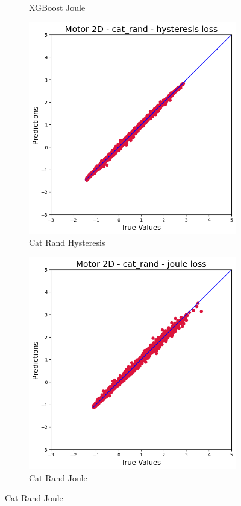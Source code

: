 \documentclass{article}
\begin{document}
\begin{figure}[!htbp]
\begin{subfigure}[b]{0.23\textwidth}
        \caption{XGBoost Joule}
    \end{subfigure}
    \hfill
    \begin{subfigure}[b]{0.23\textwidth}
        \centering
        \includegraphics[width=\textwidth]{images/2D/cat_rand_hysteresis.png}
        \caption{Cat Rand Hysteresis}
    \end{subfigure}
    \hfill
    \begin{subfigure}[b]{0.23\textwidth}
        \centering
        \includegraphics[width=\textwidth]{images/2D/cat_rand_joule.png}
        \caption{Cat Rand Joule}
    \end{subfigure}
    

\end{figure}
\end{document}
